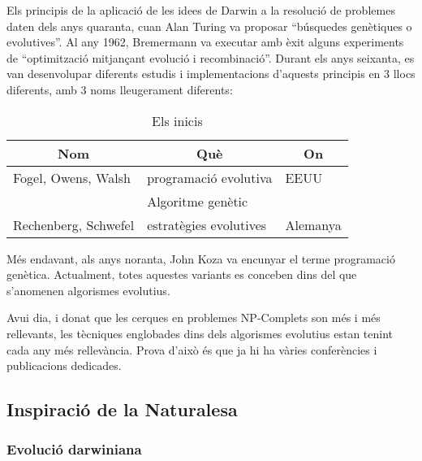 \documentclass[a4paper]{article}
\begin{document}
Els principis de la aplicació de les idees de Darwin a la resolució de problemes
daten dels anys quaranta, cuan Alan Turing va proposar ``búsquedes genètiques o
evolutives''.  Al any 1962, Bremermann va executar amb èxit alguns experiments
de ``optimització mitjançant evolució i recombinació''.  Durant els anys
seixanta, es van desenvolupar diferents estudis i implementacions d'aquests
principis en 3 llocs diferents, amb 3 noms lleugerament diferents:


\begin{table}
\centering
\caption{Els inicis}
\begin{tabular}{|l|l|l|}
\hline
\multicolumn{1}{|c|}{\textbf{Nom }} & \multicolumn{1}{c|}{\textbf{ Què }} & \multicolumn{1}{c|}{\textbf{ On}} \\
\hline
\hline
Fogel, Owens, Walsh  & programació evolutiva  & EEUU     \\
                     & Algoritme genètic      &   \\
Rechenberg, Schwefel & estratègies evolutives & Alemanya \\
\hline
\end{tabular}
\end{table}

Més endavant, als anys noranta, John Koza va encunyar el terme programació
genètica.  Actualment, totes aquestes variants es conceben dins del que
s'anomenen algorismes evolutius.


Avui dia, i donat que les cerques en problemes NP-Complets son més i més
rellevants, les tècniques englobades dins dels algorismes evolutius estan tenint
cada any més rellevància.  Prova d'això és que ja hi ha vàries conferències
i publicacions dedicades.

\subsection{Inspiració de la Naturalesa} %
\label{sub:Inspiracio de la Naturalesa}

\subsubsection{Evolució darwiniana} %
\label{ssub:Evolucio darwiniana}
\end{document}
